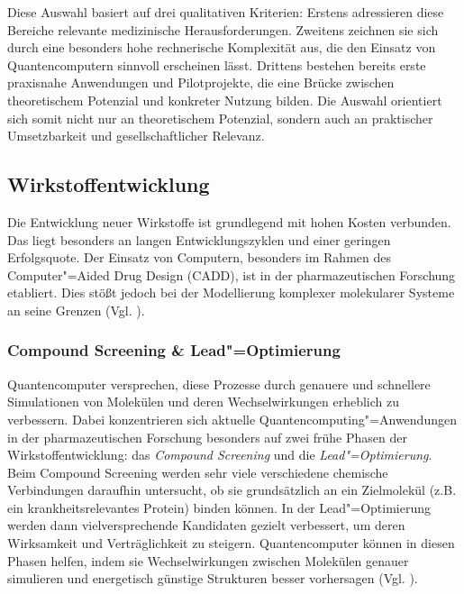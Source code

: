 Diese Auswahl basiert auf drei qualitativen Kriterien: Erstens adressieren diese Bereiche relevante medizinische Herausforderungen. Zweitens zeichnen sie sich durch eine besonders hohe rechnerische Komplexität aus, die den Einsatz von Quantencomputern sinnvoll erscheinen lässt. Drittens bestehen bereits erste praxisnahe Anwendungen und Pilotprojekte, die eine Brücke zwischen theoretischem Potenzial und konkreter Nutzung bilden. Die Auswahl orientiert sich somit nicht nur an theoretischem Potenzial, sondern auch an praktischer Umsetzbarkeit und gesellschaftlicher Relevanz.\\

\subsection{Wirkstoffentwicklung}
Die Entwicklung neuer Wirkstoffe ist grundlegend mit hohen Kosten verbunden. Das liegt besonders an langen Entwicklungszyklen und einer geringen Erfolgsquote. Der Einsatz von Computern, besonders im Rahmen des Computer"=Aided Drug Design (CADD), ist in der pharmazeutischen Forschung etabliert. Dies stößt jedoch bei der Modellierung komplexer molekularer Systeme an seine Grenzen (Vgl. \cite{bertl_quantum_2025}).\\

\subsubsection*{Compound Screening \& Lead"=Optimierung}
Quantencomputer versprechen, diese Prozesse durch genauere und schnellere Simulationen von Molekülen und deren Wechselwirkungen erheblich zu verbessern. Dabei konzentrieren sich aktuelle Quantencomputing"=Anwendungen in der pharmazeutischen Forschung besonders auf zwei frühe Phasen der Wirkstoffentwicklung: das \textit{Compound Screening} und die \textit{Lead"=Optimierung}. Beim Compound Screening werden sehr viele verschiedene chemische Verbindungen daraufhin untersucht, ob sie grundsätzlich an ein Zielmolekül (z.B. ein krankheitsrelevantes Protein) binden können. In der Lead"=Optimierung werden dann vielversprechende Kandidaten gezielt verbessert, um deren Wirksamkeit und Verträglichkeit zu steigern. Quantencomputer können in diesen Phasen helfen, indem sie Wechselwirkungen zwischen Molekülen genauer simulieren und energetisch günstige Strukturen besser vorhersagen (Vgl. \cite{zinner_quantum_2021}).\\

